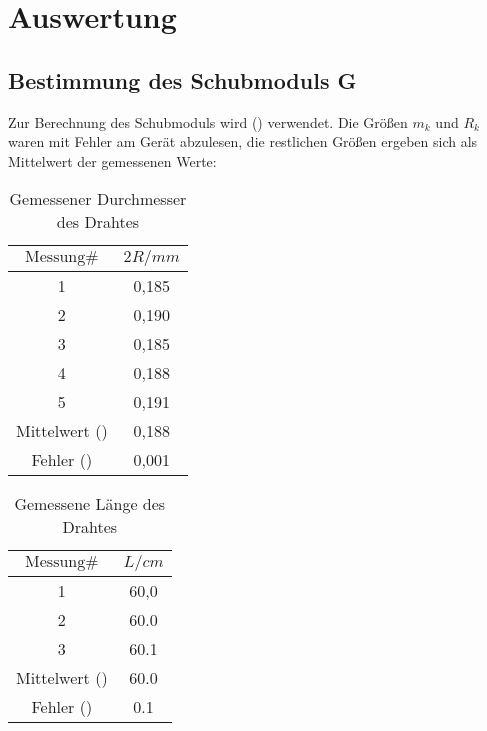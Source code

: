\section{Auswertung}
\label{sec:Auswertung}

\subsection{Bestimmung des Schubmoduls G}

Zur Berechnung des Schubmoduls wird () verwendet.
Die Größen $m_k$ und $R_k$ waren mit Fehler am Gerät abzulesen,
die restlichen Größen ergeben sich als Mittelwert der gemessenen Werte:

\begin{table}
\centering
\caption{Gemessener Durchmesser des Drahtes}
\label{tab:Dicke}
\begin{tabular}{ c S[table-format=1.3] }
\toprule
$\text{Messung#}$ & $2R/mm$ \\
 & 0,185   \\
2 & 0,190   \\
3 & 0,185   \\
4 & 0,188   \\
5 & 0,191   \\
\midrule
Mittelwert () & 0,188 \\
Fehler () & 0,001\\
\bottomrule
\end{tabular}
\end{table}

\begin{table}
\centering
\caption{Gemessene Länge des Drahtes}
\label{tab:Dicke}
\begin{tabular}{ c S[table-format=2.1] }
\toprule
$\text{Messung#}$ & $L/cm$ \\
 & 60,0   \\
2 & 60.0   \\
3 & 60.1   \\
\midrule
Mittelwert () & 60.0 \\
Fehler () & 0.1 \\
\bottomrule
\end{tabular}
\end{table}

